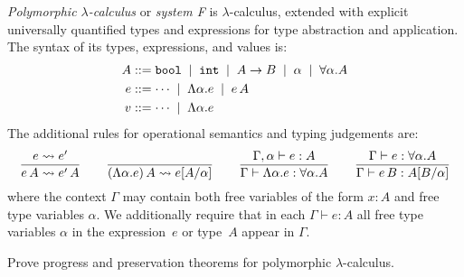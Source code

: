 \documentclass[arhiv]{izpit}
\begin{document}
\nadaljevanje


\naloga[\tocke{20}]

\emph{Polymorphic $\lambda$-calculus} or \emph{system F} is $\lambda$-calculus, extended with explicit universally quantified types and expressions for type abstraction and application. The syntax of its types, expressions, and values is:
\begin{align*}
  A &\mathrel{{:}{:}{=}}
  \mathtt{bool} \;\mid\;
  \mathtt{int} \;\mid\;
  A \to B \;\mid\;
  \alpha \;\mid\;
  \forall \alpha. A \\
  e &\mathrel{{:}{:}{=}}
  \cdots \;\mid\;
  \Lambda \alpha. e \;\mid\;
  e \, A \\
  v &\mathrel{{:}{:}{=}}
  \cdots \;\mid\;
  \Lambda \alpha. e
\end{align*}
The additional rules for operational semantics and typing judgements are:
\[
\frac{
  e \leadsto e'
}{
  e \, A \leadsto e' \, A
}
\qquad
\frac{
  \hbox{}
}{
  (\Lambda \alpha. e)\,A \leadsto e[A / \alpha]
}
\qquad
\frac{
  \Gamma, \alpha \vdash e : A
}{
  \Gamma \vdash \Lambda \alpha. e : \forall \alpha. A
}
\qquad
\frac{
  \Gamma \vdash e : \forall \alpha. A
}{
  \Gamma \vdash e \, B : A[B / \alpha]
}
\]
where the context $\Gamma$ may contain both free variables of the form $x : A$ and free type variables $\alpha$. We additionally require that in each $\Gamma \vdash e : A$ all free type variables $\alpha$ in the expression~$e$ or type~$A$ appear in $\Gamma$.

Prove progress and preservation theorems for polymorphic $\lambda$-calculus.

\nadaljevanje

\end{document}
